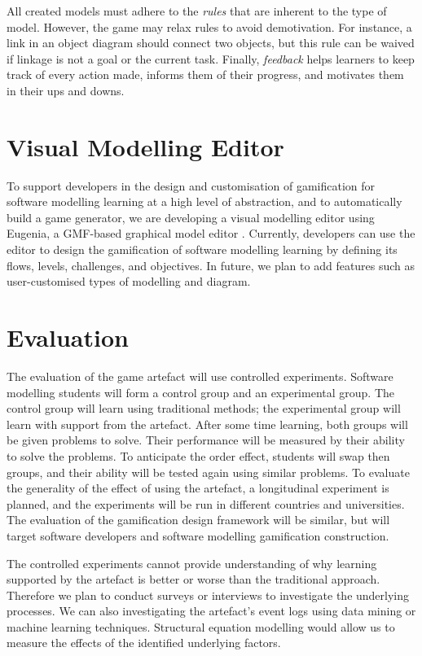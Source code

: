 \documentclass[runningheads,a4paper]{llncs}
\begin{document}
All created models must adhere to the \emph{rules} that are inherent to the type of  model.  However, the game may relax  rules to avoid demotivation. For instance, a link in an object diagram should connect two objects, but this rule can be waived if linkage is not a goal or the current task. Finally, \emph{feedback} helps learners to keep track of every action  made,  informs them of their progress, and  motivates them in their ups and downs.

\section{Visual Modelling Editor}
To support developers in the design and customisation of gamification for software modelling learning at a high level of abstraction, and to automatically build a game generator, we are developing a visual modelling editor using Eugenia, a GMF-based graphical model editor \cite{kolovos2015eugenia}. Currently, developers can use the editor to design the gamification of software modelling learning by defining its flows, levels, challenges, and objectives. In  future, we plan to add  features such as user-customised types of modelling and diagram. 

\section{Evaluation}
The evaluation of the game artefact will use controlled experiments. Software modelling students will form a control group and an experimental group. The control group will learn using traditional methods; the experimental group will learn with support from the artefact. After some time learning, both groups will be given problems to solve. Their performance will be measured by their ability to solve the problems. To anticipate the order effect, students will swap then groups, and their ability will be tested again using similar problems.  To evaluate the generality of the effect of using the artefact, a longitudinal experiment is planned, and the experiments will be run in different countries and universities. The evaluation of the gamification design framework will be similar, but will target software developers and software modelling gamification construction.

The controlled experiments cannot provide understanding of why learning supported by the artefact is better or worse than the traditional approach. Therefore we plan to conduct surveys or interviews to investigate the underlying processes.   We can also investigating the artefact's event logs using data mining or machine learning techniques.   Structural equation modelling \cite{hair2016primer} would allow us to measure the effects of the identified underlying factors.  
\end{document}
